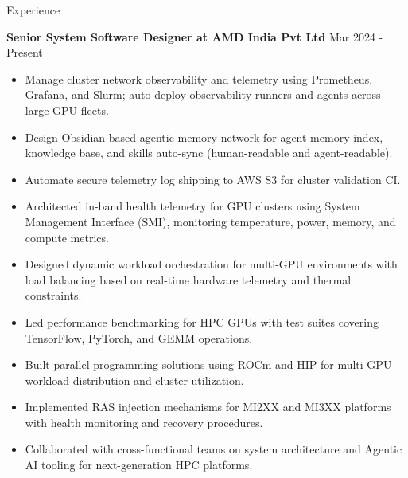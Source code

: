 \documentclass{resume} %
\begin{document}


\begin{rSection}{Experience}

{\bf Senior System Software Designer at AMD India Pvt Ltd} \hfill {Mar 2024 - Present }
\begin{itemize}
    \item Manage cluster network observability and telemetry using Prometheus, Grafana, and Slurm; auto-deploy observability runners and agents across large GPU fleets.
    \item Design Obsidian-based agentic memory network for agent memory index, knowledge base, and skills auto-sync (human-readable and agent-readable).
    \item Automate secure telemetry log shipping to AWS S3 for cluster validation CI.
    \item Architected in-band health telemetry for GPU clusters using System Management Interface (SMI), monitoring temperature, power, memory, and compute metrics.
    \item Designed dynamic workload orchestration for multi-GPU environments with load balancing based on real-time hardware telemetry and thermal constraints.
    \item Led performance benchmarking for HPC GPUs with test suites covering TensorFlow, PyTorch, and GEMM operations.
    \item Built parallel programming solutions using ROCm and HIP for multi-GPU workload distribution and cluster utilization.
    \item Implemented RAS injection mechanisms for MI2XX and MI3XX platforms with health monitoring and recovery procedures.
    \item Collaborated with cross-functional teams on system architecture and Agentic AI tooling for next-generation HPC platforms.
\end{itemize}


\end{rSection}
\end{document}
